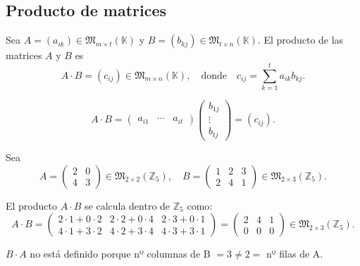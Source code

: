 \documentclass[a4paper,12pt]{article}
\begin{document}
\subsection{Producto de matrices}

\begin{procedimiento}[title=Producto de matrices]
Sea $A = (a_{ik}) \in \mathfrak{M}_{m \times t}(\mathbb{K})$ y $B = (b_{kj}) \in \mathfrak{M}_{t \times n}(\mathbb{K})$.  
El producto de las matrices $A$ y $B$ es
\[
A \cdot B = (c_{ij}) \in \mathfrak{M}_{m \times n}(\mathbb{K}),
\quad \text{donde} \quad
c_{ij} = \sum_{k=1}^{t} a_{ik} b_{kj}.
\]

\[
A \cdot B =
\begin{pmatrix}
a_{i1} & \cdots & a_{it}
\end{pmatrix}
\begin{pmatrix}
b_{1j} \\ \vdots \\ b_{tj}
\end{pmatrix}
=
(c_{ij}).
\]
\end{procedimiento}

\begin{ejemplo}[title=Ejemplo de producto de matrices]
Sea
\[
A =
\begin{pmatrix}
2 & 0 \\
4 & 3
\end{pmatrix} \in \mathfrak{M}_{2 \times 2}(\mathbb{Z}_5), 
\quad
B =
\begin{pmatrix}
1 & 2 & 3 \\
2 & 4 & 1
\end{pmatrix} \in \mathfrak{M}_{2 \times 3}(\mathbb{Z}_5).
\]

El producto $A \cdot B$ se calcula dentro de $\mathbb{Z}_5$ como:
\[
A \cdot B =
\begin{pmatrix}
2\cdot 1 + 0 \cdot 2 & 2\cdot 2 + 0 \cdot 4 & 2\cdot 3 + 0 \cdot 1 \\
4\cdot 1 + 3 \cdot 2 & 4\cdot 2 + 3 \cdot 4 & 4\cdot 3 + 3 \cdot 1
\end{pmatrix} =
\begin{pmatrix}
2 & 4 & 1 \\
0 & 0 & 0
\end{pmatrix} \in \mathfrak{M}_{2 \times 3}(\mathbb{Z}_5).
\]

$B \cdot A$ no está definido porque nº columnas de B $= 3 \neq 2 = $ nº filas de A.
\end{ejemplo}
\end{document}
